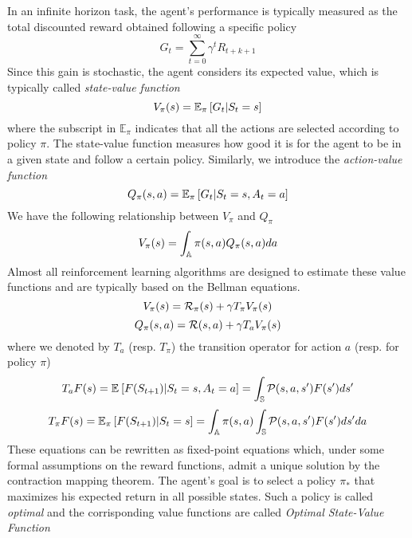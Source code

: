 In an infinite horizon task, the agent's performance is typically measured as the total discounted reward obtained following a specific policy
\begin{equation}
	G_t = \sum^{\infty}_{t=0} \gamma^t R_{t+k+1} 
\end{equation}
Since this gain is stochastic, the agent considers its expected value, which is typically called \emph{state-value function}
\begin{equation}
	V_\pi(s) = \E[\pi]{G_t|S_t = s}
\end{equation}
where the subscript in $\mathbb{E}_{\pi}$ indicates that all the actions are selected according to policy $\pi$. The state-value function measures how good it is for the agent to be in a given state and follow a certain policy. Similarly, we introduce the \emph{action-value function}
\begin{equation}
	Q_\pi(s,a) = \E[\pi]{G_t|S_t = s, A_t = a}
\end{equation}
We have the following relationship between $V_\pi$ and $Q_\pi$
\begin{equation}
	V_\pi(s) = \int_\A \pi(s,a) Q_\pi(s,a) da
\end{equation}
Almost all reinforcement learning algorithms are designed to estimate these 
value functions and are typically based on the Bellman equations.
\begin{equation}
	V_\pi(s) = \calR_\pi(s) + \gamma T_\pi V_\pi(s)	
	\label{eq:bellman_expectation_eq_V}
\end{equation}
\begin{equation}
		Q_\pi(s,a) = \calR(s,a) + \gamma T_a V_\pi(s)
		\label{eq:bellman_expectation_eq_Q}
\end{equation}
where we denoted by $T_a$ (resp. $T_\pi$) the transition operator for action 
$a$ (resp. for policy $\pi$)
\begin{equation}
	T_a F(s) = \E{F(S_{t+1})|S_t = s, A_t = a} = \int_\S \calP(s, a, s') F(s') ds'
\end{equation}
\begin{equation}
	T_\pi F(s) = \E[\pi]{F(S_{t+1})|S_t = s} = \int_\A \pi(s,a) \int_\S \calP(s,a,s') F(s') ds'	da
\end{equation}
These equations can be rewritten as fixed-point equations which, under some formal assumptions on the reward functions, admit a unique solution by the contraction mapping theorem. The agent's goal is to select a policy $\pi_*$ that maximizes his expected return in all possible states. Such a policy is called \emph{optimal} and the corrisponding value functions are called \emph{Optimal State-Value Function}
